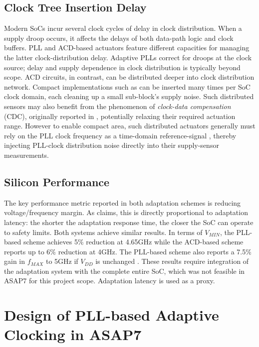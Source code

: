 \documentclass[twoside,9pt,journal,letterpage]{IEEEtran}
\begin{document}
\vspace{-10pt}
\subsection{Clock Tree Insertion Delay}
\label{sec:clktree}

Modern SoCs incur several clock cycles of delay in clock distribution. When a supply droop occurs, it affects the delays of both data-path logic and clock buffers. PLL and ACD-based actuators feature different capacities for managing the latter clock-distribution delay. Adaptive PLLs correct for droops at the clock source; delay and supply dependence in clock distribution is typically beyond scope. ACD circuits, in contrast, can be distributed deeper into clock distribution network. Compact implementations such as \cite{kwak2016self} can be inserted many times per SoC clock domain, each cleaning up a small sub-block's supply noise. Such distributed sensors may also benefit from the phenomenon of \textit{clock-data compensation} (CDC), originally reported in \cite{wong2006enhancing}, potentially relaxing their required actuation range. However to enable compact area, such distributed actuators generally must rely on the PLL clock frequency as a time-domain reference-signal \cite{kwak2016self}, thereby injecting PLL-clock distribution noise directly into their supply-sensor measurements. 


\vspace{-10pt}
\subsection{Silicon Performance}
\label{sec:performance}
The key performance metric reported in both adaptation schemes is reducing voltage/frequency margin. As \cite{hashimoto2018} claims, this is directly proportional to adaptation latency: the shorter the adaptation response time, the closer the SoC can operate to safety limits. Both systems achieve similar results. In terms of $V_{MIN}$, the PLL-based scheme achieves 5\% reduction at 4.65GHz \cite{hashimoto2018} while the ACD-based scheme reports up to 6\% reduction \cite{wilcox2015} at 4GHz. The PLL-based scheme also reports a 7.5\% gain in $f_{MAX}$ to 5GHz if $V_{DD}$ is unchanged \cite{hashimoto2018}. These results require integration of the adaptation system with the complete entire SoC, which was not feasible in ASAP7 for this project scope. Adaptation latency is used as a proxy.

\section{Design of PLL-based Adaptive Clocking in ASAP7}
\label{sec:pll-design}
\end{document}
